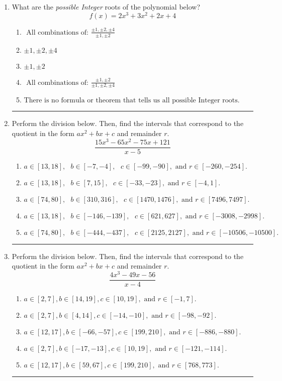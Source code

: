 \documentclass[14pt]{extbook}
\newcommand{\litem}[1]{\item#1\hspace*{-1cm}\rule{\textwidth}{0.4pt}}
\begin{document}
\begin{enumerate}
{\begin{enumerate}[label=\Alph*.]
\end{enumerate} }
\litem{
What are the \textit{possible Integer} roots of the polynomial below?\[ f(x) = 2x^{3} +3 x^{2} +2 x + 4 \]\begin{enumerate}[label=\Alph*.]
\item \( \text{ All combinations of: }\frac{\pm 1,\pm 2,\pm 4}{\pm 1,\pm 2} \)
\item \( \pm 1,\pm 2,\pm 4 \)
\item \( \pm 1,\pm 2 \)
\item \( \text{ All combinations of: }\frac{\pm 1,\pm 2}{\pm 1,\pm 2,\pm 4} \)
\item \( \text{There is no formula or theorem that tells us all possible Integer roots.} \)

\end{enumerate} }
\litem{
Perform the division below. Then, find the intervals that correspond to the quotient in the form $ax^2+bx+c$ and remainder $r$.\[ \frac{15x^{3} -65 x^{2} -75 x + 121}{x -5} \]\begin{enumerate}[label=\Alph*.]
\item \( a \in [13, 18], \text{   } b \in [-7, -4], \text{   } c \in [-99, -90], \text{   and   } r \in [-260, -254]. \)
\item \( a \in [13, 18], \text{   } b \in [7, 15], \text{   } c \in [-33, -23], \text{   and   } r \in [-4, 1]. \)
\item \( a \in [74, 80], \text{   } b \in [310, 316], \text{   } c \in [1470, 1476], \text{   and   } r \in [7496, 7497]. \)
\item \( a \in [13, 18], \text{   } b \in [-146, -139], \text{   } c \in [621, 627], \text{   and   } r \in [-3008, -2998]. \)
\item \( a \in [74, 80], \text{   } b \in [-444, -437], \text{   } c \in [2125, 2127], \text{   and   } r \in [-10506, -10500]. \)

\end{enumerate} }
\litem{
Perform the division below. Then, find the intervals that correspond to the quotient in the form $ax^2+bx+c$ and remainder $r$.\[ \frac{4x^{3} -49 x -56}{x -4} \]\begin{enumerate}[label=\Alph*.]
\item \( a \in [2, 7], b \in [14, 19], c \in [10, 19], \text{ and } r \in [-1, 7]. \)
\item \( a \in [2, 7], b \in [4, 14], c \in [-14, -10], \text{ and } r \in [-98, -92]. \)
\item \( a \in [12, 17], b \in [-66, -57], c \in [199, 210], \text{ and } r \in [-886, -880]. \)
\item \( a \in [2, 7], b \in [-17, -13], c \in [10, 19], \text{ and } r \in [-121, -114]. \)
\item \( a \in [12, 17], b \in [59, 67], c \in [199, 210], \text{ and } r \in [768, 773]. \)


\end{enumerate}}
\end{enumerate}
\end{document}
